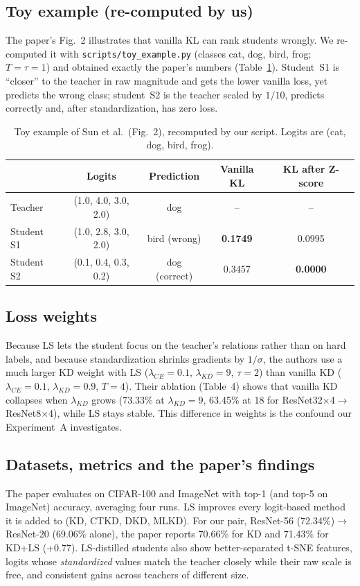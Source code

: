 \documentclass[12pt,a4paper]{article}
\begin{document}
\subsection{Toy example (re-computed by us)}
The paper's Fig.~2 illustrates that vanilla KL can rank students wrongly. We re-computed it with \texttt{scripts/toy\_example.py} (classes cat, dog, bird, frog; $T=\tau=1$) and obtained exactly the paper's numbers (Table~\ref{tab:toy}). Student~S1 is ``closer'' to the teacher in raw magnitude and gets the lower vanilla loss, yet predicts the wrong class; student~S2 is the teacher scaled by $1/10$, predicts correctly and, after standardization, has zero loss.

\begin{table}[H]
\centering
\caption{Toy example of Sun et al.\ (Fig.~2), recomputed by our script. Logits are (cat, dog, bird, frog).}
\label{tab:toy}
\begin{tabular}{lcccc}
\toprule
 & Logits & Prediction & Vanilla KL & KL after Z-score \\
\midrule
Teacher & (1.0, 4.0, 3.0, 2.0) & dog & -- & -- \\
Student S1 & (1.0, 2.8, 3.0, 2.0) & bird (wrong) & \textbf{0.1749} & 0.0995 \\
Student S2 & (0.1, 0.4, 0.3, 0.2) & dog (correct) & 0.3457 & \textbf{0.0000} \\
\bottomrule
\end{tabular}
\end{table}

\subsection{Loss weights}
Because LS lets the student focus on the teacher's relations rather than on hard labels, and because standardization shrinks gradients by $1/\sigma$, the authors use a much larger KD weight with LS ($\lambda_{CE}=0.1$, $\lambda_{KD}=9$, $\tau=2$) than vanilla KD ($\lambda_{CE}=0.1$, $\lambda_{KD}=0.9$, $T=4$). Their ablation (Table~4) shows that vanilla KD collapses when $\lambda_{KD}$ grows (73.33\% at $\lambda_{KD}=9$, 63.45\% at 18 for ResNet32$\times$4$\rightarrow$ResNet8$\times$4), while LS stays stable. This difference in weights is the confound our Experiment~A investigates.

\subsection{Datasets, metrics and the paper's findings}
The paper evaluates on CIFAR-100 and ImageNet with top-1 (and top-5 on ImageNet) accuracy, averaging four runs. LS improves every logit-based method it is added to (KD, CTKD, DKD, MLKD). For our pair, ResNet-56 (72.34\%)$\rightarrow$ResNet-20 (69.06\% alone), the paper reports 70.66\% for KD and 71.43\% for KD+LS (+0.77). LS-distilled students also show better-separated t-SNE features, logits whose \emph{standardized} values match the teacher closely while their raw scale is free, and consistent gains across teachers of different size.
\end{document}
